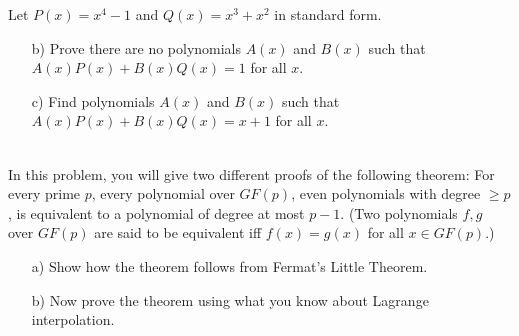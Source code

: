 \documentclass[]{article}
\newif\ifsolutions
\renewcommand{\answer}[1]{{\color{mydarkblue}\textbf{Solution:}#1}}
\begin{document}
\begin{qunlist}
\begin{itemize}
\end{itemize}


Let $P(x) = x^4 - 1$ and $Q(x) = x^3 + x^2$ in standard form.
\begin{itemize}
\qpart
\item[b)] Prove there are no polynomials $A(x)$ and $B(x)$ such that $A(x) P(x) + B(x) Q(x) = 1$ for all $x$.

\ifsolutions{ \answer { We can compute the GCD of $P(x)$ and $Q(x)$, and show it is not 1. Dividing $P(x)$ (higher degree) by $Q(x)$, we get
\[ x^4 - 1 = (x^3 + x^2)(x-1) + (x^2 -1). \]
So now we've reduced $gcd(x^4-1, x^3 + x^2)$ to the problem of $gcd(x^2-1,x^3+x^2)$. Now dividing $x^3 + x^2$ by $x^2-1$, we get
\[ x^3 + x^2 = (x^2-1)(x+1) + (x+1). \]
Now we've reduced the problem to $gcd(x^2-1, x+1)$. Dividing again, we get a remainder of 0:
\[ x^2 - 1 = (x+1)(x-1) + 0. \]
So therefore $gcd(P(x), Q(x)) = x+1$, so there do not exist $A(x)$ and $B(x)$ such that $A(x) P(x) + B(x) Q(x) = 1$ $\forall x$.
}}\fi


\qpart
\item[c)] Find polynomials $A(x)$ and $B(x)$ such that $A(x) P(x) + B(x) Q(x) = x + 1$ for all $x$. 

\ifsolutions{ \answer {
Using extended gcd for polynomials, we can work our way backwards from the result of part (b) to find $A(x)$ and $B(x)$. We know that 
\[ x+1 = (x^3 + x^2) - (x+1)(x^2-1) \]
Plugging in the formula for $x^2-1$, we get
\begin{align*}
x+1 & = (x^3 + x^2) - (x+1)[(x^4 - 1) - (x^3 + x^2)(x-1)] \\
& = -(x+1)(x^4 - 1) + x^2(x^3+x^2) \end{align*}
So therefore, $A(x)=-(x+1)$ and $B(x)=x^2$.
}}\fi

\end{itemize}






 \\   %
In this problem, you will give two different proofs of the following theorem: For every prime $p$, every polynomial over $GF(p)$, even polynomials with degree $\geq p$, is equivalent to a polynomial of degree at most $p-1$. (Two polynomials $f,g$ over $GF(p)$ are said to be equivalent iff $f(x)=g(x)$ for all $x\in GF(p)$.)

\begin{enumerate}
\qpart
\item[a)] Show how the theorem follows from Fermat's Little Theorem. 
\qpart
\item[b)] Now prove the theorem using what you know about Lagrange interpolation.
\end{enumerate}



\end{qunlist}
\end{document}
